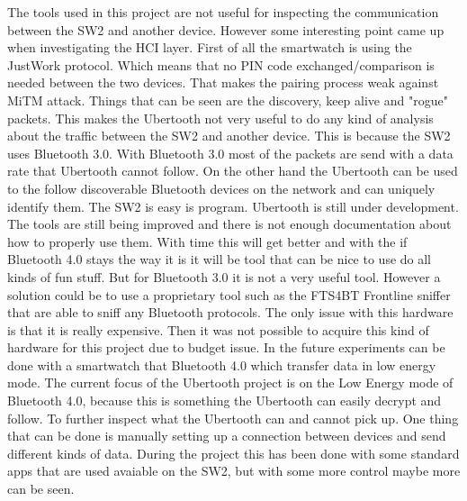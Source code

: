 The tools used in this project are not useful for inspecting the communication between the SW2 and another device. However some interesting point came up when investigating the HCI layer. First of all the smartwatch is using the JustWork protocol. Which means that no PIN code exchanged/comparison is needed between the two devices. That makes the pairing process weak against MiTM attack. Things that can be seen are the discovery, keep alive and  "rogue" packets. This makes the Ubertooth not very useful to do any kind of analysis about the traffic between the SW2 and another device. This is because the SW2 uses Bluetooth 3.0. With Bluetooth 3.0  most of the packets are send with a data rate that Ubertooth cannot follow. \pend  On the other hand the Ubertooth can be used to the follow discoverable Bluetooth devices on the network and can uniquely identify them. The SW2 is easy is program. 
Ubertooth is still under development. The tools are still being improved and there is not enough documentation about how to properly use them. With time this will get better and with the if Bluetooth 4.0 stays the way it is it will be tool that can be nice to use do all kinds of fun stuff. But for Bluetooth 3.0 it is not a very useful tool. However a solution could be to use a proprietary tool such as the FTS4BT Frontline sniffer \cite{FTS4BT} that are able to sniff any Bluetooth protocols. The only issue with this hardware is that it is really expensive. Then it was not possible to acquire this kind of hardware for this project due to budget issue.
\pend
In the future experiments can be done with a smartwatch that Bluetooth 4.0 which transfer data in low energy mode. The current focus of the Ubertooth project is on the Low Energy mode of Bluetooth 4.0, because this is something the Ubertooth can easily decrypt and follow. 
To further inspect what the Ubertooth can and cannot pick up. One thing that can be done is manually setting up a connection between devices and send different kinds of data. During the project this has been done with some standard apps that are used avaiable on the SW2, but with some more control maybe more can be seen. \pend